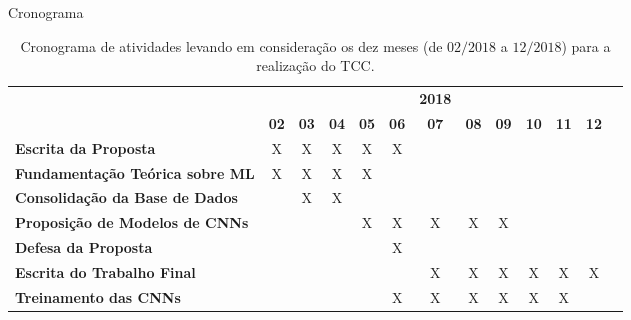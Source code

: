 \begin{frame}{Cronograma}
   \ \  \\[0.1cm]
   \begin{table}
   \caption{Cronograma de atividades levando em consideração os dez meses (de $02/2018$ a $12/2018$) para a realização do TCC.}
   \label{tab:cronograma}

   \begin{center}
   \begin{small}
   \begin{tabular}{p{5cm}cccccccccccc}
     \toprule
     & &  &  & &  & \textbf{2018}  & &  &  &  &  & \\
                                           & \textbf{02} & \textbf{03} & \textbf{04} & \textbf{05} & \textbf{06} & \textbf{07} & \textbf{08} & \textbf{09} & \textbf{10} & \textbf{11} & \textbf{12} \\
     \midrule
     \textbf{Escrita da Proposta}          &      X      &      X      &      X      &      X      &      X      &             &             &             &             &             &             \\
     \textbf{Fundamentação Teórica sobre
     ML}                     &      X      &      X      &      X      &      X      &             &             &             &             &             &             &             \\
     \textbf{Consolidação da Base de Dados}&             &      X      &      X      &             &             &             &             &             &             &             &             \\
     \textbf{Proposição de Modelos de
    CNNs}         &             &             &             &      X      &      X      &      X      &      X      &      X      &             &             &             \\
     \textbf{Defesa da Proposta}          &             &             &             &             &      X      &             &             &             &             &             &             \\
     \textbf{Escrita do Trabalho Final}    &             &             &             &             &             &      X      &      X      &      X      &      X      &      X      &      X      \\
     \textbf{Treinamento das
     CNNs}         &             &             &             &             &      X      &      X      &      X      &      X      &      X      &      X       &            \\

\end{tabular}
\end{small}
\end{center}
\end{table}
\end{frame}
